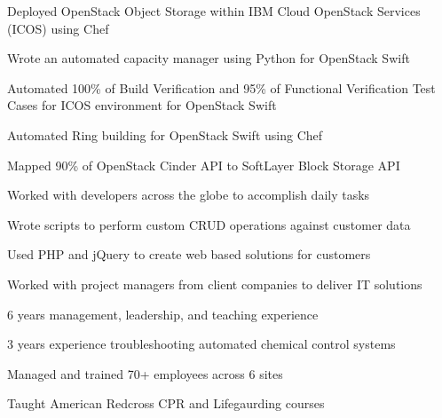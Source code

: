 \documentclass[letterpaper]{resume} %
\begin{document}
\begin{minipage}[t]{0.66\textwidth}
\sectionspace %

\begin{tightitemize}
\item Deployed OpenStack Object Storage within IBM Cloud OpenStack Services (ICOS) using Chef
\item Wrote an automated capacity manager using Python for OpenStack Swift
\item Automated 100\% of Build Verification and 95\% of Functional Verification Test Cases for ICOS environment for OpenStack Swift
\item Automated Ring building for OpenStack Swift using Chef
\item Mapped 90\% of OpenStack Cinder API to SoftLayer Block Storage API
\item Worked with developers across the globe to accomplish daily tasks
\end{tightitemize}

\sectionspace %



\begin{tightitemize}
\item Wrote scripts to perform custom CRUD operations against customer data
\item Used PHP and jQuery to create web based solutions for customers
\item Worked with project managers from client companies to deliver IT solutions
\end{tightitemize}

\sectionspace %


\begin{tightitemize}
\item 6 years management, leadership, and teaching experience
\item 3 years experience troubleshooting automated chemical control systems
\item Managed and trained 70+ employees across 6 sites
\item Taught American Redcross CPR and Lifegaurding courses
\end{tightitemize}


\end{minipage}
\end{document}

